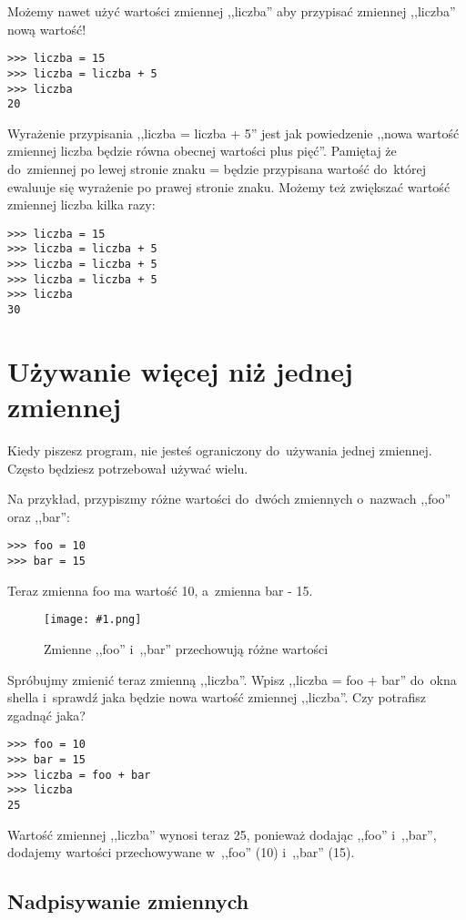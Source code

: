 \documentclass{book}
\newcommand{\img}[3]{
\begin{figure}
\centerline{
	\texttt{[image: \#1.png]}
}
\caption{#2}
\label{#1}
\end{figure}
}
\begin{document}
Możemy nawet użyć wartości zmiennej ,,liczba'' aby przypisać zmiennej ,,liczba'' nową wartość!

\begin{lstlisting}
>>> liczba = 15
>>> liczba = liczba + 5
>>> liczba
20
\end{lstlisting}

Wyrażenie przypisania ,,liczba = liczba + 5'' jest jak powiedzenie ,,nowa wartość zmiennej liczba będzie równa obecnej wartości plus pięć''. Pamiętaj że do~zmiennej po lewej stronie znaku = będzie przypisana wartość do~której ewaluuje się wyrażenie po prawej stronie znaku. Możemy też zwiększać wartość zmiennej liczba kilka razy:

\begin{lstlisting}
>>> liczba = 15
>>> liczba = liczba + 5
>>> liczba = liczba + 5
>>> liczba = liczba + 5
>>> liczba
30
\end{lstlisting}

\section{Używanie więcej niż jednej zmiennej}

Kiedy piszesz program, nie jesteś ograniczony do~używania jednej zmiennej. Często będziesz potrzebował używać wielu.

Na przykład, przypiszmy różne wartości do~dwóch zmiennych o~nazwach ,,foo'' oraz ,,bar'':

\begin{lstlisting}
>>> foo = 10
>>> bar = 15
\end{lstlisting}

Teraz zmienna foo ma wartość 10, a~zmienna bar - 15.

\img{idle-zmienne}{Zmienne ,,foo'' i~,,bar'' przechowują różne wartości}{10 cm}

Spróbujmy zmienić teraz zmienną ,,liczba''. Wpisz ,,liczba = foo + bar'' do~okna shella i~sprawdź jaka będzie nowa wartość zmiennej ,,liczba''. Czy potrafisz zgadnąć jaka?

\begin{lstlisting}
>>> foo = 10
>>> bar = 15
>>> liczba = foo + bar
>>> liczba
25
\end{lstlisting}

Wartość zmiennej ,,liczba'' wynosi teraz 25, ponieważ dodając ,,foo'' i~,,bar'', dodajemy wartości przechowywane w~,,foo'' (10) i~,,bar'' (15).

\subsection{Nadpisywanie zmiennych}
\end{document}
